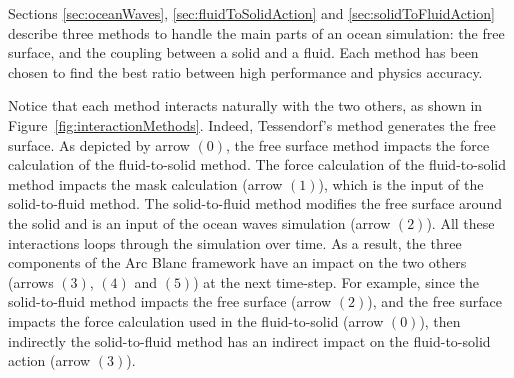 \documentclass[11pt]{article}
\def\framework{the Arc Blanc framework\xspace}
\def\ie{\emph{i.e.}\xspace}
\begin{document}
Sections \ref{sec:oceanWaves}, \ref{sec:fluidToSolidAction} and \ref{sec:solidToFluidAction} describe three methods to handle the main parts of an ocean simulation: the free surface, and the coupling between a solid and a fluid.
Each method has been chosen to find the best ratio between high performance and physics accuracy.

Notice that each method interacts naturally with the two others, as shown in Figure~\ref{fig:interactionMethods}.
Indeed, Tessendorf's method generates the free surface.
As depicted by arrow $(0)$, the free surface method impacts the force calculation of the fluid-to-solid method.
The force calculation of the fluid-to-solid method impacts the mask calculation (arrow $(1)$), which is the input of the solid-to-fluid method.
The solid-to-fluid method modifies the free surface around the solid and is an input of the ocean waves simulation (arrow $(2)$).
All these interactions loops through the simulation over time.
As a result, the three components of \framework have an impact on the two others (arrows $(3)$, $(4)$ and $(5)$) at the next time-step.
For example, since the solid-to-fluid method impacts the free surface (arrow $(2)$), and the free surface impacts the force calculation used in the fluid-to-solid (arrow $(0)$), then indirectly the solid-to-fluid method has an indirect impact on the fluid-to-solid action (arrow $(3)$).
\end{document}
